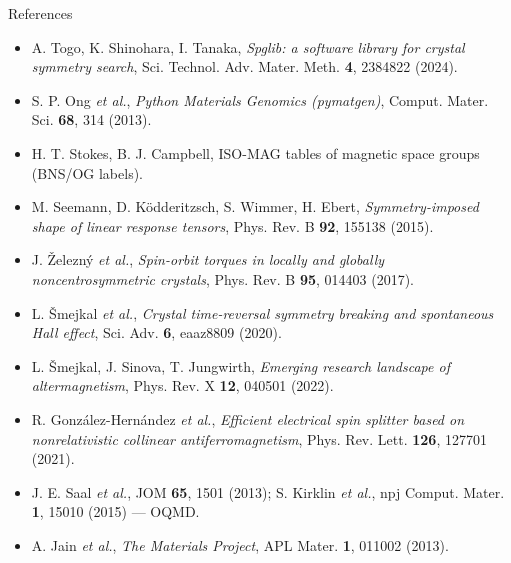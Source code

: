\documentclass[aspectratio=169,11pt]{beamer}
\begin{document}
\begin{frame}{References}
\scriptsize
\begin{itemize}\setlength\itemsep{0.25em}
  \item A. Togo, K. Shinohara, I. Tanaka, \emph{Spglib: a software library for crystal symmetry search}, Sci. Technol. Adv. Mater. Meth. \textbf{4}, 2384822 (2024).
  \item S. P. Ong \emph{et al.}, \emph{Python Materials Genomics (pymatgen)}, Comput. Mater. Sci. \textbf{68}, 314 (2013).
  \item H. T. Stokes, B. J. Campbell, ISO-MAG tables of magnetic space groups (BNS/OG labels).
  \item M. Seemann, D. Ködderitzsch, S. Wimmer, H. Ebert, \emph{Symmetry-imposed shape of linear response tensors}, Phys. Rev. B \textbf{92}, 155138 (2015).
  \item J. Železný \emph{et al.}, \emph{Spin-orbit torques in locally and globally noncentrosymmetric crystals}, Phys. Rev. B \textbf{95}, 014403 (2017).
  \item L. Šmejkal \emph{et al.}, \emph{Crystal time-reversal symmetry breaking and spontaneous Hall effect}, Sci. Adv. \textbf{6}, eaaz8809 (2020).
  \item L. Šmejkal, J. Sinova, T. Jungwirth, \emph{Emerging research landscape of altermagnetism}, Phys. Rev. X \textbf{12}, 040501 (2022).
  \item R. González-Hernández \emph{et al.}, \emph{Efficient electrical spin splitter based on nonrelativistic collinear antiferromagnetism}, Phys. Rev. Lett. \textbf{126}, 127701 (2021).
  \item J. E. Saal \emph{et al.}, JOM \textbf{65}, 1501 (2013); S. Kirklin \emph{et al.}, npj Comput. Mater. \textbf{1}, 15010 (2015) — OQMD.
  \item A. Jain \emph{et al.}, \emph{The Materials Project}, APL Mater. \textbf{1}, 011002 (2013).
\end{itemize}
\end{frame}

\begin{frame}[plain]
\end{frame}
\end{document}
